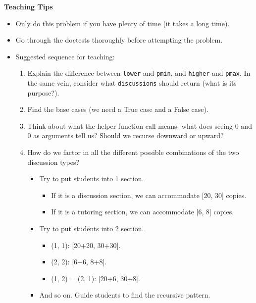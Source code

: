     \begin{guide}
    \begin{blocksection}
    \textbf{Teaching Tips}
    \begin{itemize}
        \item Only do this problem if you have plenty of time (it takes a long time).
        \item Go through the doctests thoroughly before attempting the problem.
        \item Suggested sequence for teaching:
        \begin{enumerate}
            \item Explain the difference between \lstinline{lower} and \lstinline{pmin}, and \lstinline{higher} and \lstinline{pmax}. In the same vein, consider what \lstinline{discussions} should return (what is its purpose?).
            \item Find the base cases (we need a True case and a False case).
            \item Think about what the helper function call means- what does seeing 0 and 0 as arguments tell us? Should we recurse downward or upward?
            \item How do we factor in all the different possible combinations of the two discussion types?
            \begin{itemize}
                \item Try to put students into 1 section.
                \begin{itemize}
                    \item If it is a discussion section, we can accommodate [20, 30] copies.
                    \item If it is a tutoring section, we can accommodate [6, 8] copies.
                \end{itemize}
                \item Try to put students into 2 section.
                \begin{itemize}
                    \item (1, 1): [20+20, 30+30].
                    \item (2, 2): [6+6, 8+8].
                    \item (1, 2) = (2, 1): [20+6, 30+8].
                \end{itemize}
                \item And so on. Guide students to find the recursive pattern.
    
            \end{itemize}
        \end{enumerate}
    \end{itemize}
    \end{blocksection}
    \end{guide}
    
